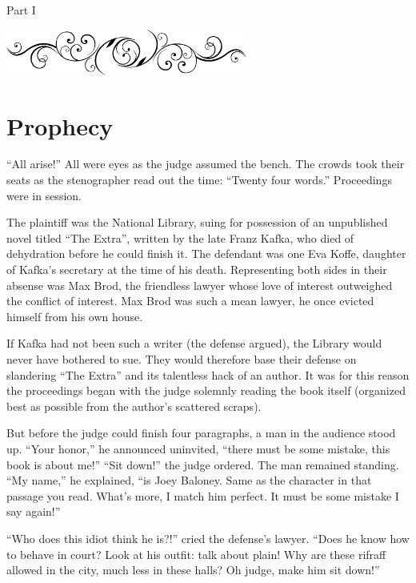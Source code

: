 \documentclass[oneside]{book}
\begin{document}
\vspace{.1in}

{
\center
\Huge
Part I
\par
}

\vspace{.25in}
{
\center
\includegraphics[width=300px]{yydiv.eps}
\par
}

\chapter{Prophecy}


``All arise!''  All were eyes as the judge assumed the bench.  The crowds took their seats as the stenographer
read out the time:  ``Twenty four words.''  Proceedings were in session.

The plaintiff was the National Library,
suing for possession of an unpublished novel titled ``The Extra'',
written by the late Franz Kafka, who died of dehydration before he could
finish it.  The defendant was one Eva Koffe, daughter of Kafka's secretary
at the time of his death.  Representing both sides in their absense was Max Brod,
the friendless lawyer whose love of interest outweighed
the conflict of interest.  Max Brod was such a mean lawyer,
he once evicted himself from his own house.

If Kafka had not been such a writer (the defense argued),
the Library would never have bothered to sue.
They would therefore base their defense on slandering ``The
Extra'' and its talentless hack of an author.  It was for this
reason the proceedings began with the
judge solemnly reading the book itself (organized
best as possible from the author's scattered scraps).

But before the judge could finish four paragraphs, a man in the audience stood up.
``Your honor,'' he announced uninvited, ``there must be some mistake, this book is
about me!''  ``Sit down!'' the judge ordered.  The man remained standing.  ``My name,''
he explained, ``is Joey Baloney.  Same as the character in that passage you read.
What's more, I match him perfect.  It must be some mistake I say again!''

``Who does this idiot think he is?!'' cried the defense's lawyer.
``Does he know how to behave in court?  Look at his outfit: talk about plain!
Why are these rifraff allowed in the city, much less in these halls?
Oh judge, make him sit down!''
\end{document}
